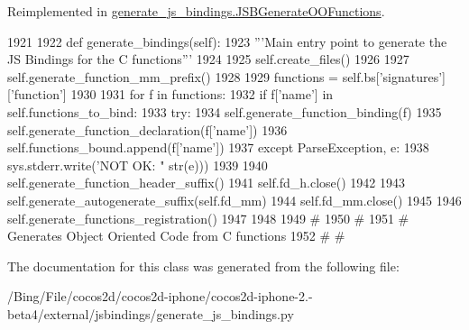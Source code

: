 Reimplemented in \hyperlink{classgenerate__js__bindings_1_1_j_s_b_generate_o_o_functions_a12275db8c6baeac82e6f25f922f34e0e}{generate\-\_\-js\-\_\-bindings.\-J\-S\-B\-Generate\-O\-O\-Functions}.


\begin{DoxyCode}
1921 
1922     def generate_bindings(self):
1923         '''Main entry point to generate the JS Bindings for the C functions'''
1924 
1925         self.create_files()
1926 
1927         self.generate_function_mm_prefix()
1928 
1929         functions = self.bs['signatures']['function']
1930 
1931         for f in functions:
1932             if f['name'] in self.functions_to_bind:
1933                 try:
1934                     self.generate_function_binding(f)
1935                     self.generate_function_declaration(f['name'])
1936                     self.functions_bound.append(f['name'])
1937                 except ParseException, e:
1938                     sys.stderr.write('NOT OK: "%
      str(e)))
1939 
1940         self.generate_function_header_suffix()
1941         self.fd_h.close()
1942 
1943         self.generate_autogenerate_suffix(self.fd_mm)
1944         self.fd_mm.close()
1945 
1946         self.generate_functions_registration()
1947 
1948 
1949 #
1950 #
1951 # Generates Object Oriented Code from C functions
1952 #
#
\end{DoxyCode}


The documentation for this class was generated from the following file\-:\begin{DoxyCompactItemize}
\item 
/\-Bing/\-File/cocos2d/cocos2d-\/iphone/cocos2d-\/iphone-\/2.-\/beta4/external/jsbindings/generate\-\_\-js\-\_\-bindings.\-py\end{DoxyCompactItemize}

